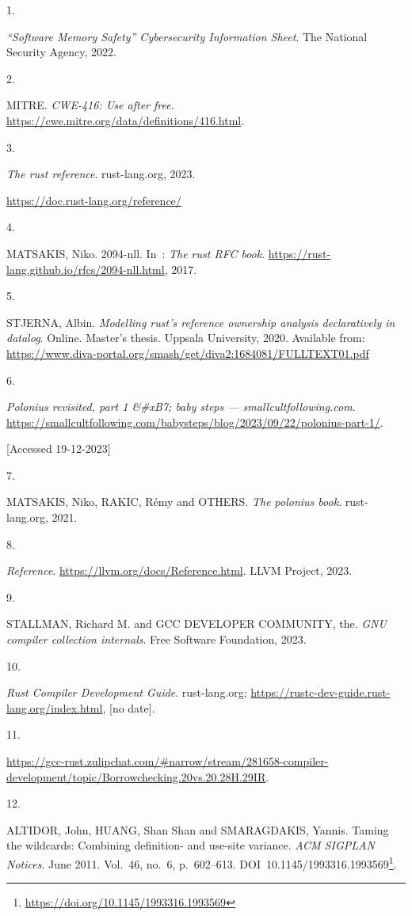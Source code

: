 \documentclass[
  11pt,
]{report}
\newlength{\cslhangindent}
\newlength{\csllabelwidth}
\newenvironment{CSLReferences}[2] %
 {\begin{list}{}{%
  \setlength{\itemindent}{0pt}
  \setlength{\leftmargin}{0pt}
  \setlength{\parsep}{0pt}
  \ifodd #1
   \setlength{\leftmargin}{\cslhangindent}
   \setlength{\itemindent}{-1\cslhangindent}
  \fi
  \setlength{\itemsep}{#2\baselineskip}}}
 {\end{list}}
\newcommand{\CSLLeftMargin}[1]{\parbox[t]{\csllabelwidth}{\strut#1\strut}}
\newcommand{\CSLRightInline}[1]{\parbox[t]{\linewidth - \csllabelwidth}{\strut#1\strut}}
\DeclareRobustCommand{\href}[2]{#2\footnote{\url{#1}}}
\begin{document}
\label{refs}
\begin{CSLReferences}{0}{1}
\CSLLeftMargin{1. }%
\CSLRightInline{\emph{{{``Software Memory Safety''}} {C}ybersecurity
{I}nformation {S}heet}. The National Security Agency, 2022. }

\CSLLeftMargin{2. }%
\CSLRightInline{MITRE. \emph{CWE-416: Use after free}.
\url{https://cwe.mitre.org/data/definitions/416.html}. }

\CSLLeftMargin{3. }%
\CSLRightInline{\emph{The rust reference}. rust-lang.org, 2023. }%
\CSLRightInline{\url{https://doc.rust-lang.org/reference/}}

\CSLLeftMargin{4. }%
\CSLRightInline{MATSAKIS, Niko. 2094-nll. In~: \emph{The rust RFC book}.
\url{https://rust-lang.github.io/rfcs/2094-nll.html}, 2017. }

\CSLLeftMargin{5. }%
\CSLRightInline{STJERNA, Albin. \emph{Modelling rust's reference
ownership analysis declaratively in datalog}. Online. Master's thesis.
Uppsala University, 2020. Available from:
\url{https://www.diva-portal.org/smash/get/diva2:1684081/FULLTEXT01.pdf}}

\CSLLeftMargin{6. }%
\CSLRightInline{\emph{{P}olonius revisited, part 1 \&\#x{B}7; baby steps
--- smallcultfollowing.com}.
\url{https://smallcultfollowing.com/babysteps/blog/2023/09/22/polonius-part-1/}.
}%
\CSLRightInline{{[}Accessed 19-12-2023{]}}

\CSLLeftMargin{7. }%
\CSLRightInline{MATSAKIS, Niko, RAKIC, Rémy and OTHERS. \emph{The
polonius book}. rust-lang.org, 2021. }

\CSLLeftMargin{8. }%
\CSLRightInline{\emph{Reference}.
\url{https://llvm.org/docs/Reference.html}. LLVM Project, 2023. }

\CSLLeftMargin{9. }%
\CSLRightInline{STALLMAN, Richard M. and GCC DEVELOPER COMMUNITY, the.
\emph{GNU compiler collection internals}. Free Software Foundation,
2023. }

\CSLLeftMargin{10. }%
\CSLRightInline{\emph{{R}ust {C}ompiler {D}evelopment {G}uide}.
rust-lang.org; \url{https://rustc-dev-guide.rust-lang.org/index.html},
{[}no date{]}. }

\CSLLeftMargin{11. }%
\CSLRightInline{\url{https://gcc-rust.zulipchat.com/\#narrow/stream/281658-compiler-development/topic/Borrowchecking.20vs.20.28H.29IR}.
}

\CSLLeftMargin{12. }%
\CSLRightInline{ALTIDOR, John, HUANG, Shan Shan and SMARAGDAKIS, Yannis.
Taming the wildcards: Combining definition- and use-site variance.
\emph{ACM SIGPLAN Notices}. June 2011. Vol.~46, no.~6, p.~602--613.
DOI~\href{https://doi.org/10.1145/1993316.1993569}{10.1145/1993316.1993569}.
}

\end{CSLReferences}
\end{document}
